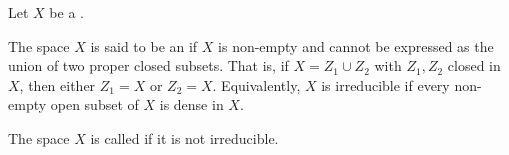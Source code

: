 \begin{definition} \label{definition:irreducible_topological_space}
Let $X$ be a . 

The space $X$ is said to be an  if $X$ is non-empty and cannot be expressed as the union of two proper closed subsets. That is, if $X = Z_1 \cup Z_2$ with $Z_1, Z_2$ closed in $X$, then either $Z_1 = X$ or $Z_2 = X$. Equivalently, $X$ is irreducible if every non-empty open subset of $X$ is dense in $X$.

The space $X$ is called  if it is not irreducible.
\end{definition}